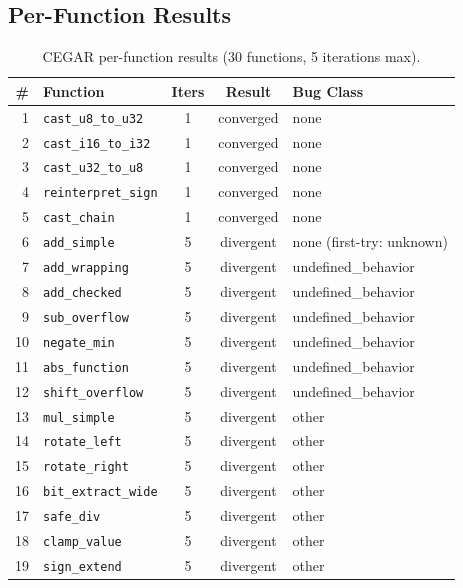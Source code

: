 \documentclass[11pt]{article}
\begin{document}
\subsection{Per-Function Results}

\begin{table}[H]
\centering
\small
\caption{CEGAR per-function results (30 functions, 5 iterations max).}\label{tab:cegar-full}
\begin{tabular}{@{}rlccl@{}}
\toprule
\textbf{\#} & \textbf{Function} & \textbf{Iters} & \textbf{Result} &
\textbf{Bug Class} \\
\midrule
1  & \texttt{cast\_u8\_to\_u32}  & 1 & converged & none \\
2  & \texttt{cast\_i16\_to\_i32} & 1 & converged & none \\
3  & \texttt{cast\_u32\_to\_u8}  & 1 & converged & none \\
4  & \texttt{reinterpret\_sign}  & 1 & converged & none \\
5  & \texttt{cast\_chain}        & 1 & converged & none \\
6  & \texttt{add\_simple}        & 5 & divergent & none (first-try: unknown) \\
7  & \texttt{add\_wrapping}      & 5 & divergent & undefined\_behavior \\
8  & \texttt{add\_checked}       & 5 & divergent & undefined\_behavior \\
9  & \texttt{sub\_overflow}      & 5 & divergent & undefined\_behavior \\
10 & \texttt{negate\_min}        & 5 & divergent & undefined\_behavior \\
11 & \texttt{abs\_function}      & 5 & divergent & undefined\_behavior \\
12 & \texttt{shift\_overflow}    & 5 & divergent & undefined\_behavior \\
13 & \texttt{mul\_simple}        & 5 & divergent & other \\
14 & \texttt{rotate\_left}       & 5 & divergent & other \\
15 & \texttt{rotate\_right}      & 5 & divergent & other \\
16 & \texttt{bit\_extract\_wide} & 5 & divergent & other \\
17 & \texttt{safe\_div}          & 5 & divergent & other \\
18 & \texttt{clamp\_value}       & 5 & divergent & other \\
19 & \texttt{sign\_extend}       & 5 & divergent & other \\

\end{tabular}
\end{table}
\end{document}
